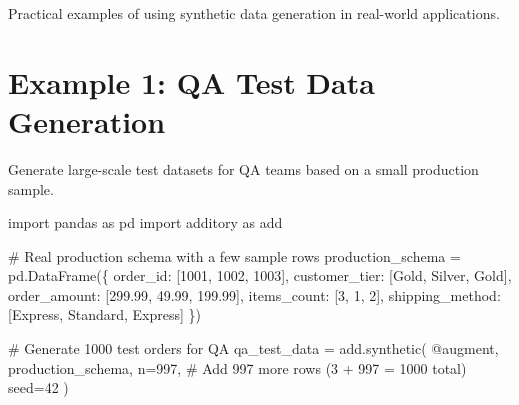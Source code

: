 \documentclass[
  letterpaper,
]{scrbook}
\newenvironment{Shaded}{\begin{snugshade}}{\end{snugshade}}
\newcommand{\CommentTok}[1]{\textcolor[rgb]{0.37,0.37,0.37}{#1}}
\newcommand{\DecValTok}[1]{\textcolor[rgb]{0.68,0.00,0.00}{#1}}
\newcommand{\FloatTok}[1]{\textcolor[rgb]{0.68,0.00,0.00}{#1}}
\newcommand{\ImportTok}[1]{\textcolor[rgb]{0.00,0.46,0.62}{#1}}
\newcommand{\NormalTok}[1]{\textcolor[rgb]{0.00,0.23,0.31}{#1}}
\newcommand{\OperatorTok}[1]{\textcolor[rgb]{0.37,0.37,0.37}{#1}}
\newcommand{\StringTok}[1]{\textcolor[rgb]{0.13,0.47,0.30}{#1}}
\begin{document}
Practical examples of using synthetic data generation in real-world
applications.

\section{Example 1: QA Test Data
Generation}\label{example-1-qa-test-data-generation}

Generate large-scale test datasets for QA teams based on a small
production sample.

\begin{Shaded}
\begin{Highlighting}[]
\ImportTok{import}\NormalTok{ pandas }\ImportTok{as}\NormalTok{ pd}
\ImportTok{import}\NormalTok{ additory }\ImportTok{as}\NormalTok{ add}

\CommentTok{\# Real production schema with a few sample rows}
\NormalTok{production\_schema }\OperatorTok{=}\NormalTok{ pd.DataFrame(\{}
    \StringTok{\textquotesingle{}order\_id\textquotesingle{}}\NormalTok{: [}\DecValTok{1001}\NormalTok{, }\DecValTok{1002}\NormalTok{, }\DecValTok{1003}\NormalTok{],}
    \StringTok{\textquotesingle{}customer\_tier\textquotesingle{}}\NormalTok{: [}\StringTok{\textquotesingle{}Gold\textquotesingle{}}\NormalTok{, }\StringTok{\textquotesingle{}Silver\textquotesingle{}}\NormalTok{, }\StringTok{\textquotesingle{}Gold\textquotesingle{}}\NormalTok{],}
    \StringTok{\textquotesingle{}order\_amount\textquotesingle{}}\NormalTok{: [}\FloatTok{299.99}\NormalTok{, }\FloatTok{49.99}\NormalTok{, }\FloatTok{199.99}\NormalTok{],}
    \StringTok{\textquotesingle{}items\_count\textquotesingle{}}\NormalTok{: [}\DecValTok{3}\NormalTok{, }\DecValTok{1}\NormalTok{, }\DecValTok{2}\NormalTok{],}
    \StringTok{\textquotesingle{}shipping\_method\textquotesingle{}}\NormalTok{: [}\StringTok{\textquotesingle{}Express\textquotesingle{}}\NormalTok{, }\StringTok{\textquotesingle{}Standard\textquotesingle{}}\NormalTok{, }\StringTok{\textquotesingle{}Express\textquotesingle{}}\NormalTok{]}
\NormalTok{\})}

\CommentTok{\# Generate 1000 test orders for QA}
\NormalTok{qa\_test\_data }\OperatorTok{=}\NormalTok{ add.synthetic(}
    \StringTok{\textquotesingle{}@augment\textquotesingle{}}\NormalTok{,}
\NormalTok{    production\_schema,}
\NormalTok{    n}\OperatorTok{=}\DecValTok{997}\NormalTok{,  }\CommentTok{\# Add 997 more rows (3 + 997 = 1000 total)}
\NormalTok{    seed}\OperatorTok{=}\DecValTok{42}
\NormalTok{)}


\end{Highlighting}
\end{Shaded}
\end{document}
